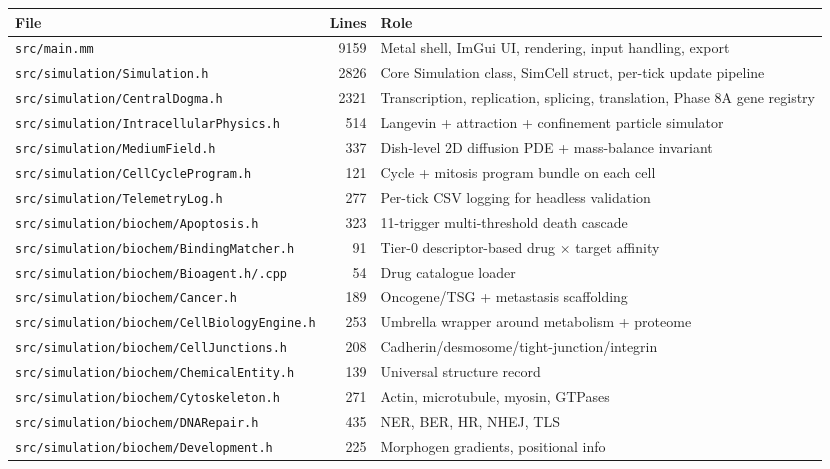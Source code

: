 \documentclass[11pt,letterpaper,twoside,openany]{book}
\newcommand{\file}[1]{\texttt{\small#1}}
\begin{document}
\begin{longtable}{lrp{8cm}}
\toprule
\textbf{File} & \textbf{Lines} & \textbf{Role}\\ \midrule
\file{src/main.mm}                             & 9159 & Metal shell, ImGui UI, rendering, input handling, export\\
\file{src/simulation/Simulation.h}             & 2826 & Core Simulation class, SimCell struct, per-tick update pipeline\\
\file{src/simulation/CentralDogma.h}           & 2321 & Transcription, replication, splicing, translation, Phase 8A gene registry\\
\file{src/simulation/IntracellularPhysics.h}   & 514  & Langevin + attraction + confinement particle simulator\\
\file{src/simulation/MediumField.h}            & 337  & Dish-level 2D diffusion PDE + mass-balance invariant\\
\file{src/simulation/CellCycleProgram.h}       & 121  & Cycle + mitosis program bundle on each cell\\
\file{src/simulation/TelemetryLog.h}           & 277  & Per-tick CSV logging for headless validation\\
\file{src/simulation/biochem/Apoptosis.h}      & 323  & 11-trigger multi-threshold death cascade\\
\file{src/simulation/biochem/BindingMatcher.h} &  91  & Tier-0 descriptor-based drug $\times$ target affinity\\
\file{src/simulation/biochem/Bioagent.h/.cpp}  &  54  & Drug catalogue loader\\
\file{src/simulation/biochem/Cancer.h}         & 189  & Oncogene/TSG + metastasis scaffolding\\
\file{src/simulation/biochem/CellBiologyEngine.h} & 253 & Umbrella wrapper around metabolism + proteome\\
\file{src/simulation/biochem/CellJunctions.h}  & 208  & Cadherin/desmosome/tight-junction/integrin\\
\file{src/simulation/biochem/ChemicalEntity.h} & 139  & Universal structure record\\
\file{src/simulation/biochem/Cytoskeleton.h}   & 271  & Actin, microtubule, myosin, GTPases\\
\file{src/simulation/biochem/DNARepair.h}      & 435  & NER, BER, HR, NHEJ, TLS\\
\file{src/simulation/biochem/Development.h}    & 225  & Morphogen gradients, positional info\\

\end{longtable}
\end{document}
